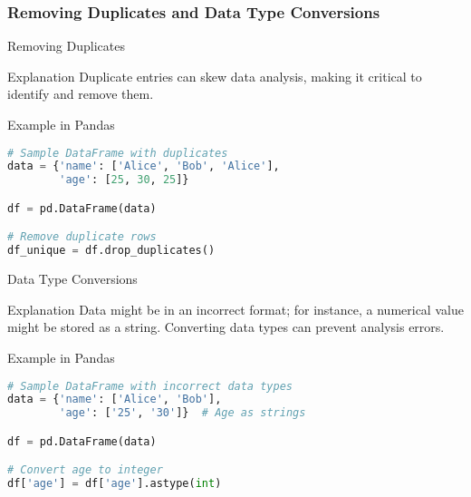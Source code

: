 \documentclass[aspectratio=169]{beamer}
\begin{document}
\begin{frame}[fragile]
  \frametitle{Removing Duplicates and Data Type Conversions}
  
  \begin{block}{Removing Duplicates}
    \begin{block}{Explanation}
      Duplicate entries can skew data analysis, making it critical to identify and remove them.
    \end{block}
    
    \begin{block}{Example in Pandas}
      \begin{lstlisting}[language=Python]
# Sample DataFrame with duplicates
data = {'name': ['Alice', 'Bob', 'Alice'],
        'age': [25, 30, 25]}

df = pd.DataFrame(data)

# Remove duplicate rows
df_unique = df.drop_duplicates()
      \end{lstlisting}
    \end{block}
  \end{block}

  \begin{block}{Data Type Conversions}
    \begin{block}{Explanation}
      Data might be in an incorrect format; for instance, a numerical value might be stored as a string. Converting data types can prevent analysis errors.
    \end{block}
    
    \begin{block}{Example in Pandas}
      \begin{lstlisting}[language=Python]
# Sample DataFrame with incorrect data types
data = {'name': ['Alice', 'Bob'],
        'age': ['25', '30']}  # Age as strings

df = pd.DataFrame(data)

# Convert age to integer
df['age'] = df['age'].astype(int)
      \end{lstlisting}
    \end{block}
  \end{block}
\end{frame}
\end{document}
